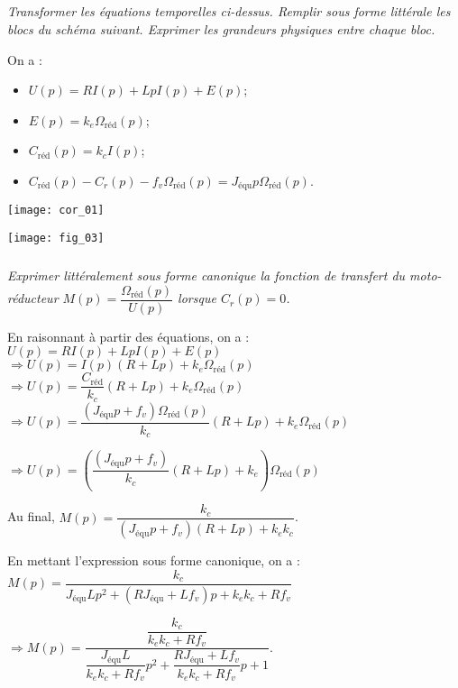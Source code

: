 \begin{multicols}{2}
\subparagraph{}\textit{Transformer les équations temporelles ci-dessus. 
Remplir sous forme littérale les blocs du schéma suivant. Exprimer les grandeurs physiques entre chaque bloc. }
\ifprof
\begin{corrige}
On a : 
\begin{itemize}
\item $U(p) = R I(p) + LpI(p)+ E(p)$;
\item $E(p) = k_e  \Omega_{\text{réd}}(p)$;
\item $C_{\text{réd}} (p)= k_c  I(p)$;
\item $C_{\text{réd}} (p) - C_r(p) - f_v \Omega_{\text{réd}}(p)= J_{\text{équ}}  p \Omega_{\text{réd}}(p)$. 
\end{itemize}
\end{corrige}
\begin{center}
\texttt{[image: cor\_01]}
\end{center}

\else
\fi

\begin{center}
\texttt{[image: fig\_03]}
\end{center}


\subparagraph{}\textit{Exprimer littéralement sous forme canonique la fonction de transfert du moto-réducteur $M(p)=\dfrac{\Omega_{\text{réd}}(p)}{U(p)}$ lorsque $C_r(p)=0$.}
\ifprof
\begin{corrige}
En raisonnant à partir des équations, on a : 
$U(p) = R I(p) + LpI(p)+ E(p)$ 
$\Rightarrow U(p) = I(p) \left(R + Lp\right)+ k_e  \Omega_{\text{réd}}(p)$
$\Rightarrow U(p) = \dfrac{C_{\text{réd}}}{k_c} \left(R + Lp\right)+ k_e  \Omega_{\text{réd}}(p)$
$\Rightarrow U(p) = \dfrac{\left( J_{\text{équ}}  p +f_v\right)\Omega_{\text{réd}}(p)}{k_c} \left(R + Lp\right)+ k_e  \Omega_{\text{réd}}(p)$

$\Rightarrow U(p) = \left(\dfrac{\left( J_{\text{équ}}  p +f_v\right)}{k_c} \left(R + Lp\right)+ k_e \right) \Omega_{\text{réd}}(p)$

Au final, $M(p)=\dfrac{k_c}{ \left( J_{\text{équ}}  p +f_v\right) \left(R + Lp\right)+ k_e k_c}$.

En mettant l'expression sous forme canonique, on a :
$M(p)=\dfrac{k_c}{   J_{\text{équ}}   Lp^2 +\left( RJ_{\text{équ}}    +  L f_v\right) p + k_e k_c+Rf_v}$

$\Rightarrow  M(p)=\dfrac{\dfrac{k_c}{k_e k_c+Rf_v}}{  \dfrac{ J_{\text{équ}}   L}{k_e k_c+Rf_v}p^2 +\dfrac{ RJ_{\text{équ}}    +  L f_v}{k_e k_c+Rf_v}p +1 }$.


\end{corrige}
\end{multicols}

